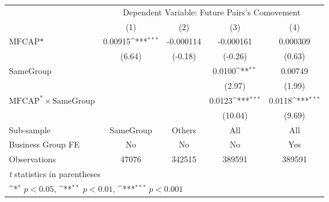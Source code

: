 {
\def\sym#1{\ifmmode^{#1}\else\(^{#1}\)\fi}
\begin{tabular}{l*{4}{c}}
\hline\hline
                &\multicolumn{4}{c}{Dependent Variable:  Future Pairs's Comovement}         \\\cmidrule(lr){2-5}
                &\multicolumn{1}{c}{(1)}         &\multicolumn{1}{c}{(2)}         &\multicolumn{1}{c}{(3)}         &\multicolumn{1}{c}{(4)}         \\
\hline
$ \text{MFCAP*} $&  0.00915\sym{***}&-0.000114         &-0.000161         & 0.000309         \\
                &   (6.64)         &  (-0.18)         &  (-0.26)         &   (0.63)         \\
[1em]
SameGroup       &                  &                  &   0.0100\sym{**} &  0.00749         \\
                &                  &                  &   (2.97)         &   (1.99)         \\
[1em]
 $ \text{MFCAP}^* \times {\text{SameGroup} }  $ &                  &                  &   0.0123\sym{***}&   0.0118\sym{***}\\
                &                  &                  &  (10.04)         &   (9.69)         \\
\hline
Sub-sample      &SameGroup         &   Others         &      All         &      All         \\
Business Group FE&       No         &       No         &       No         &      Yes         \\
Observations    &    47076         &   342515         &   389591         &   389591         \\
\hline\hline
\multicolumn{5}{l}{\footnotesize \textit{t} statistics in parentheses}\\
\multicolumn{5}{l}{\footnotesize \sym{*} \(p<0.05\), \sym{**} \(p<0.01\), \sym{***} \(p<0.001\)}\\
\end{tabular}
}
